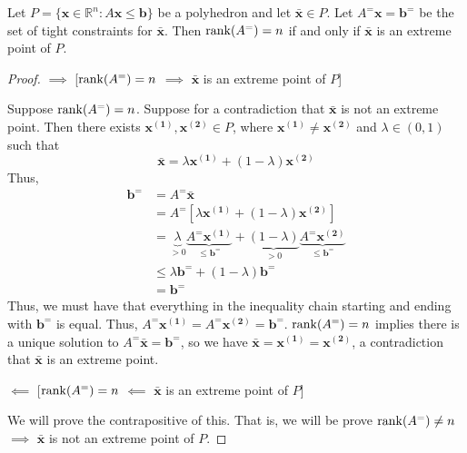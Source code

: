 \begin{thmbox}
    \begin{theorem}
        Let $ P=\{\bm{x}\in\mathbb{R}^n:A \bm{x}\leqslant \bm{b}\} $ be
        a polyhedron and let $ \bm{\bar{x}}\in P $.
        Let $ A^=\bm{x} = \bm{b}^= $ be the set of tight constraints
        for $ \bm{\bar{x}} $.
        Then $ \operatorname{rank}(A^=)=n $ if and only if
        $\bm{\bar{x}}$ is an extreme point of $ P $.
    \end{theorem}
\end{thmbox}

\begin{proof}
    $ \implies $ [$\operatorname{rank}(A^=)=n$ $ \implies $ $\bm{\bar{x}}$ is an extreme point of $ P $]

    Suppose $ \operatorname{rank}(A^=)=n $. Suppose for a contradiction that
    $\bm{\bar{x}}$ is not an extreme point. Then there exists
    $ \bm{x^{(1)}}, \bm{x^{(2)}}\in P$, where
    $ \bm{x^{(1)}} \neq \bm{x^{(2)}} $ and $ \lambda\in(0,1) $
    such that
    \[ \bm{\bar{x}}=\lambda \bm{x^{(1)}}+(1-\lambda)\bm{x^{(2)}}\]
    Thus,
    \begin{align*}
        \bm{b^=} & =A^=\bm{\bar{x}}                                   \\
                 & =A^=[\lambda \bm{x^{(1)}}+(1-\lambda)\bm{x^{(2)}}] \\
                 & =\underbrace{\lambda}_{>0}
        \underbrace{A^=\bm{x^{(1)}}}_{\leqslant \bm{b^=}}
        +\underbrace{(1-\lambda)}_{>0}
        \underbrace{A^=\bm{x^{(2)}}}_{\leqslant \bm{b^=}}             \\
                 & \le\lambda\bm{b^=}+(1-\lambda)\bm{b^=}             \\
                 & =\bm{b^=}
    \end{align*}
    Thus, we must have that everything in the inequality chain
    starting and ending with $ \bm{b^=} $ is equal. Thus,
    $ A^=\bm{x^{(1)}}=A^=\bm{x^{(2)}}=\bm{b^=}$.
    $ \operatorname{rank}(A^=)=n $ implies there is a unique solution
    to $ A^=\bm{\bar{x}}=\bm{b^=}$, so we have
    $ \bm{\bar{x}}=\bm{x^{(1)}}=\bm{x^{(2)}} $, a contradiction that
    $ \bm{\bar{x}} $ is an extreme point.

    $ \impliedby $ [$\operatorname{rank}(A^=)=n$ $ \impliedby $ $\bm{\bar{x}}$ is an extreme point of $ P $]

    We will prove the contrapositive of this. That is, we will be prove
    $ \operatorname{rank}(A^=)\neq n $ $\implies$ $\bm{\bar{x}}$ is not
    an extreme point of $ P $.


\end{proof}
